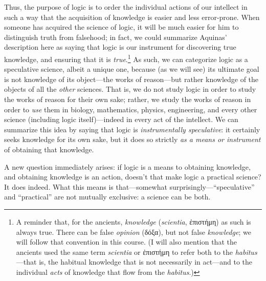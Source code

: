 \documentclass[article,12pt,a4paper,oneside]{memoir}
\begin{document}
    Thus, the purpose of logic is to order the individual actions of our
    intellect in such a way that the acquisition of knowledge is easier
    and less error-prone. When someone has acquired the science of
    logic, it will be much easier for him to distinguish truth from
    falsehood; in fact, we could summarize Aquinas' description here as
    saying that logic is our instrument for discovering true knowledge,
    and ensuring that it is \emph{true}.\footnote{A reminder that, for
      the ancients, \emph{knowledge} (\emph{scientia}, ἐπιστήμη) as such
      is always true. There can be false \emph{opinion} (δόξα), but not
      false \emph{knowledge}; we will follow that convention in this
      course. (I will also mention that the ancients used the same term
      \emph{scientia} or ἐπιστήμη to refer both to the
      \emph{habitus}---that is, the habitual knowledge that is not
      necessarily in act---and to the individual \emph{acts} of
      knowledge that flow from the \emph{habitus}.)} As such, we can
    categorize logic as a speculative science, albeit a unique one,
    because (as we will see) its ultimate goal is not knowledge of its
    object---the works of reason---but rather knowledge of the objects
    of all the \emph{other} sciences. That is, we do not study logic in
    order to study the works of reason for their own sake; rather, we
    study the works of reason in order to \emph{use} them in biology,
    mathematics, physics, engineering, and every other science
    (including logic itself)---indeed in every act of the intellect. We
    can summarize this idea by saying that logic is \emph{instrumentally
    speculative}: it certainly seeks knowledge for its own sake, but it
    does so strictly \emph{as a means or instrument} of obtaining that
    knowledge.

    A new question immediately arises: if logic is a means to obtaining
    knowledge, and obtaining knowledge is an action, doesn't that make
    logic a practical science? It does indeed. What this means is
    that---somewhat surprisingly---``speculative'' and ``practical'' are
    not mutually exclusive: a science can be both.
\end{document}
